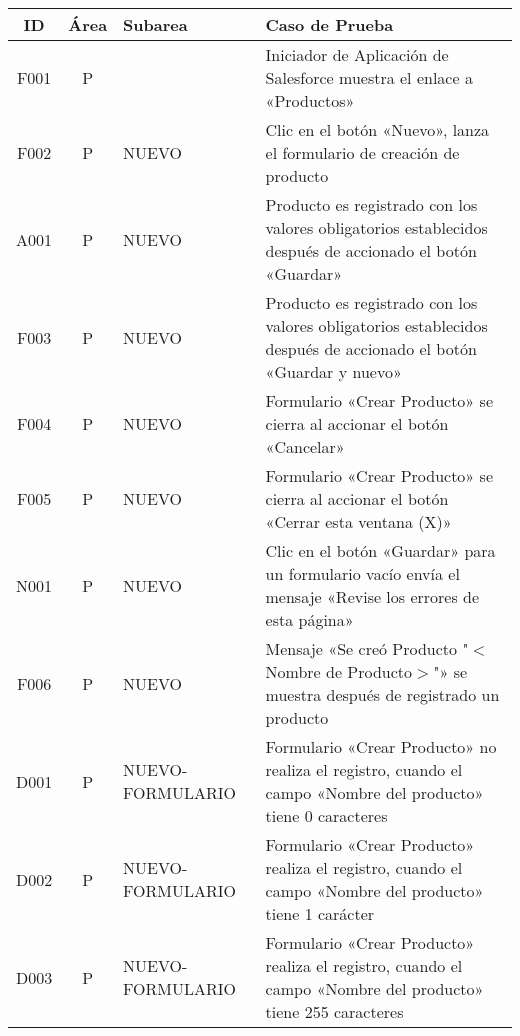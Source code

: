 \begin{landscape}
\centering
\small
{\def\arraystretch{2}
\begin{longtable}[htb]{|c|c|p{3.8cm}|p{15.2cm}|}
\hline
\scriptsize{\textbf{ID}} & \scriptsize{\textbf{Área}} &
\scriptsize{\textbf{Subarea}} & \scriptsize{\textbf{Caso de Prueba}} \\
\hline
\scriptsize{F001} & \scriptsize{P} & & \scriptsize{Iniciador de Aplicación de Salesforce muestra el enlace a «Productos»} \\ \hline
\scriptsize{F002} & \scriptsize{P} & \scriptsize{NUEVO} & \scriptsize{Clic en el botón «Nuevo», lanza el formulario de creación de producto} \\ \hline
\scriptsize{A001} & \scriptsize{P} & \scriptsize{NUEVO} & \scriptsize{Producto es registrado con los valores obligatorios establecidos después de accionado el botón «Guardar»} \\ \hline
\scriptsize{F003} & \scriptsize{P} & \scriptsize{NUEVO} & \scriptsize{Producto es registrado con los valores obligatorios establecidos después de accionado el botón «Guardar y nuevo»} \\ \hline
\scriptsize{F004} & \scriptsize{P} & \scriptsize{NUEVO} & \scriptsize{Formulario «Crear Producto» se cierra al accionar el botón «Cancelar»} \\ \hline
\scriptsize{F005} & \scriptsize{P} & \scriptsize{NUEVO} & \scriptsize{Formulario «Crear Producto» se cierra al accionar el botón «Cerrar esta ventana (X)»} \\ \hline
\scriptsize{N001} & \scriptsize{P} & \scriptsize{NUEVO} & \scriptsize{Clic en el botón «Guardar» para un formulario vacío envía el mensaje «Revise los errores de esta página»} \\ \hline
\scriptsize{F006} & \scriptsize{P} & \scriptsize{NUEVO} & \scriptsize{Mensaje «Se creó Producto "$<$Nombre de Producto$>$"» se muestra después de registrado un producto} \\ \hline
\scriptsize{D001} & \scriptsize{P} & \scriptsize{NUEVO-FORMULARIO} & \scriptsize{Formulario «Crear Producto» no realiza el registro, cuando el campo «Nombre del producto» tiene 0 caracteres} \\ \hline
\scriptsize{D002} & \scriptsize{P} & \scriptsize{NUEVO-FORMULARIO} & \scriptsize{Formulario «Crear Producto» realiza el registro, cuando el campo «Nombre del producto» tiene 1 carácter} \\ \hline
\scriptsize{D003} & \scriptsize{P} & \scriptsize{NUEVO-FORMULARIO} & \scriptsize{Formulario «Crear Producto» realiza el registro, cuando el campo «Nombre del producto» tiene 255 caracteres} \\ \hline

\end{longtable}}
\end{landscape}
